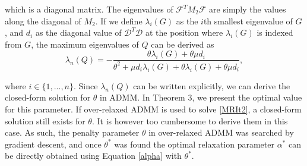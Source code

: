 \documentclass[letterpaper]{article} %
\begin{document}
\noindent which is a diagonal matrix. The eigenvalues of $\mathcal{F}^T M_2 \mathcal{F}$ are simply the values along the diagonal of $M_2$. If we define $\lambda_i(G)$ as the $i$th smallest eigenvalue of $G$, and $d_i$ as the diagonal value of $\mathcal{D}^T \mathcal{D}$ at the position where $\lambda_i(G)$ is indexed from $G$, the maximum eigenvalues of $Q$ can be derived as
\begin{equation*}
	\lambda_n(Q) = -\frac{\theta \lambda_i(G)+\theta\mu d_i}{\theta^2+\mu d_i \lambda_i(G)+\theta \lambda_i(G)+\theta\mu d_i},
\end{equation*}

where $i \in \{1,...,n\}$. Since $\lambda_n (Q)$ can be written explicitly, we can derive the closed-form solution for $\theta$ in ADMM. In Theorem 3, we present the optimal value for this parameter. If over-relaxed ADMM is used to solve \eqref{MRIt2}, a closed-form solution still exists for $\theta$. It is however too cumbersome to derive them in this case. As such, the penalty parameter $\theta$ in over-relaxed ADMM was searched by gradient descent, and once $\theta^*$ was found the optimal relaxation parameter $\alpha^*$ can be directly obtained using Equation \eqref{alpha} with $\theta^*$.
\end{document}
